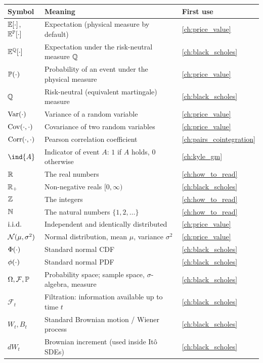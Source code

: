 \begin{longtable}{@{}l >{\raggedright\arraybackslash}p{} l@{}}
\toprule
\textbf{Symbol} & \textbf{Meaning} & \textbf{First use} \\
\midrule
\endhead
$\mathbb{E}[\cdot]$, $\mathbb{E}^{\mathbb{P}}[\cdot]$ & Expectation (physical measure by default) & \cref{ch:price_value} \\
$\mathbb{E}^{\mathbb{Q}}[\cdot]$ & Expectation under the risk-neutral measure $\mathbb{Q}$ & \cref{ch:black_scholes} \\
$\mathbb{P}(\cdot)$ & Probability of an event under the physical measure & \cref{ch:price_value} \\
$\mathbb{Q}$ & Risk-neutral (equivalent martingale) measure & \cref{ch:black_scholes} \\
$\operatorname{Var}(\cdot)$ & Variance of a random variable & \cref{ch:price_value} \\
$\operatorname{Cov}(\cdot,\cdot)$ & Covariance of two random variables & \cref{ch:price_value} \\
$\operatorname{Corr}(\cdot,\cdot)$ & Pearson correlation coefficient & \cref{ch:pairs_cointegration} \\
$\ind\{A\}$ & Indicator of event $A$: $1$ if $A$ holds, $0$ otherwise & \cref{ch:kyle_gm} \\
$\mathbb{R}$ & The real numbers & \cref{ch:how_to_read} \\
$\mathbb{R}_+$ & Non-negative reals $[0,\infty)$ & \cref{ch:black_scholes} \\
$\mathbb{Z}$ & The integers & \cref{ch:how_to_read} \\
$\mathbb{N}$ & The natural numbers $\{1,2,\dots\}$ & \cref{ch:how_to_read} \\
$\text{i.i.d.}$ & Independent and identically distributed & \cref{ch:price_value} \\
$\mathcal{N}(\mu,\sigma^2)$ & Normal distribution, mean $\mu$, variance $\sigma^2$ & \cref{ch:price_value} \\
$\Phi(\cdot)$ & Standard normal CDF & \cref{ch:black_scholes} \\
$\phi(\cdot)$ & Standard normal PDF & \cref{ch:black_scholes} \\
$\Omega, \mathcal{F}, \mathbb{P}$ & Probability space; sample space, $\sigma$-algebra, measure & \cref{ch:black_scholes} \\
$\mathcal{F}_t$ & Filtration: information available up to time $t$ & \cref{ch:black_scholes} \\
$W_t, B_t$ & Standard Brownian motion / Wiener process & \cref{ch:black_scholes} \\
$dW_t$ & Brownian increment (used inside It\^o SDEs) & \cref{ch:black_scholes} \\

\end{longtable}
